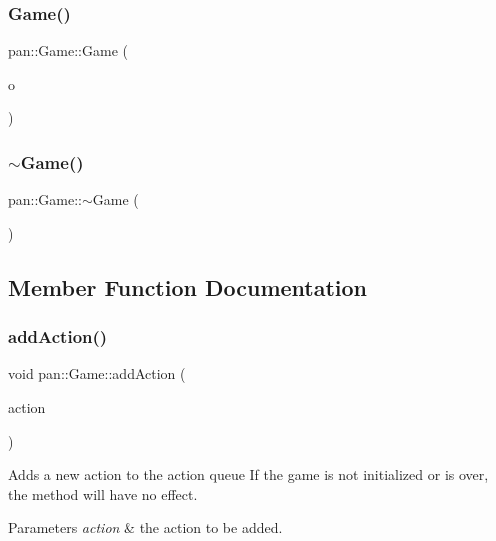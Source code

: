\subsubsection{\texorpdfstring{Game()}{Game()}\hspace{0.1cm}{\footnotesize\ttfamily [4/4]}}
{\footnotesize\ttfamily pan\+::\+Game\+::\+Game (\begin{DoxyParamCaption}\item[{\hyperlink{classpan_1_1_game}{Game} \&\&}]{o }\end{DoxyParamCaption})}

\mbox{\label{classpan_1_1_game_a9ddb30d0a2303334c87048284fa57a63}} 
\subsubsection{\texorpdfstring{$\sim$\+Game()}{~Game()}}
{\footnotesize\ttfamily pan\+::\+Game\+::$\sim$\+Game (\begin{DoxyParamCaption}{ }\end{DoxyParamCaption})}



\subsection{Member Function Documentation}
\mbox{\label{classpan_1_1_game_a4bcb881db3acea9a02d6ff3ac6e7b209}} 
\subsubsection{\texorpdfstring{add\+Action()}{addAction()}}
{\footnotesize\ttfamily void pan\+::\+Game\+::add\+Action (\begin{DoxyParamCaption}\item[{const \hyperlink{classpan_1_1_action_base}{Action\+Base} \&}]{action }\end{DoxyParamCaption})}

Adds a new action to the action queue If the game is not initialized or is over, the method will have no effect. 
\begin{DoxyParams}{Parameters}
{\em action} & the action to be added. \\
\hline
\end{DoxyParams}
\mbox{\label{classpan_1_1_game_a0a475cd974dc0de461f7fabc80ab9dce}} 
